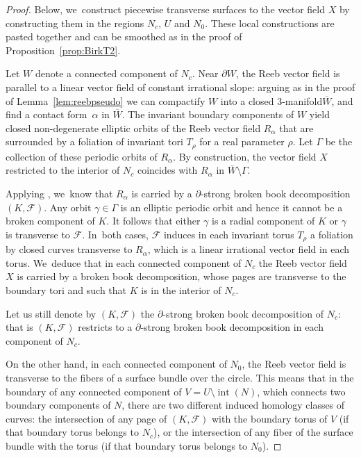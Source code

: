 \documentclass[10pt]{amsart}
\newcommand{\threemanifold}{$3$\nobreakdash-mani\-fold\xspace}
\theoremstyle{definition}
\begin{document}
\begin{proof}
Below, we~construct piecewise transverse surfaces to the vector field $X$ by constructing them in the regions $N_c$, $U$ and $N_0$. These local constructions are pasted together and can be smoothed as in the proof of Proposition~\ref{prop:BirkT2}.

Let $W$ denote a connected component of $N_c$. Near $\partial W$, the Reeb vector field is parallel to a linear vector field of constant irrational slope: arguing as in the proof of Lemma~\ref{lem:reebpseudo} we can compactify $W$ into a closed \threemanifold $\overline W$, and find a contact form~$\alpha$ in $\overline W$. The invariant boundary components of $W$ yield closed non-degenerate elliptic orbits of the Reeb vector field $R_\alpha$ that are surrounded by a foliation of invariant tori $T_\rho$ for a real parameter $\rho$. Let $\Gamma$ be the collection of these periodic orbits of $R_\alpha$.
By construction, the vector field $X$ restricted to the interior of $N_c$ coincides with $R_\alpha$ in $\overline W \setminus \Gamma$.

Applying \cite[Th.\,1.1]{CDR}, we~know that $R_\alpha$ is carried by a $\partial$-strong broken book decomposition $(K,\mathcal{F})$. Any orbit $\gamma \in \Gamma$ is an elliptic periodic orbit and hence it cannot be a broken component of $K$. It follows that either $\gamma$ is a radial component of $K$ or $\gamma$ is transverse to $\mathcal{F}$. In~both cases, $\mathcal{F}$ induces in each invariant torus $T_\rho$ a foliation by closed curves transverse to $R_\alpha$, which is a linear irrational vector field in each torus. We~deduce that in each connected component of $N_c$ the Reeb vector field $X$ is carried by a broken book decomposition, whose pages are transverse to the boundary tori and such that $K$ is in the interior of $N_c$.

Let us still denote by $(K,\mathcal{F})$ the $\partial$-strong broken book decomposition of $N_c$: that is $(K,\mathcal{F})$ restricts to a $\partial$-strong broken book decomposition in each component of $N_c$.

On the other hand, in each connected component of $N_0$, the Reeb vector field is transverse to the fibers of a surface bundle over the circle. This means that in the boundary of any connected component of $V={U\setminus \operatorname{int}(N)}$, which connects two boundary components of $N$, there are two different induced homology classes of curves: the intersection of any page of $(K,\mathcal{F})$ with the boundary torus of $V$ (if that boundary torus belongs to $N_c$), or the intersection of any fiber of the surface bundle with the torus (if that boundary torus belongs to $N_0$).\enlargethispage{.5\baselineskip}%


\end{proof}
\end{document}
